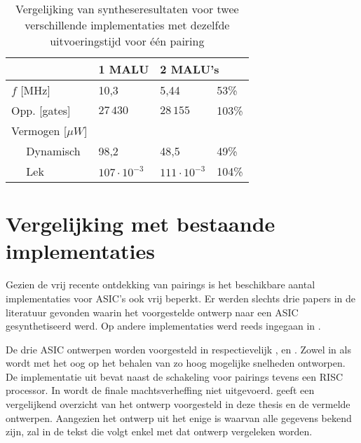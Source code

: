 \begin{table}[h]
	\caption{Vergelijking van syntheseresultaten voor twee verschillende implementaties met dezelfde uitvoeringstijd voor \'e\'en pairing}
	\label{tabel-resultaten-m1-vs-m2}

	\centering
	\begin{tabular}{lll@{$\;\;$}l}
		\toprule
		& 1 MALU	& \multicolumn{2}{l}{2 MALU's}\\
		\midrule
		$f$ [MHz]					& 10,3						& 5,44						& 53\% \\ 
		Opp. [gates]				& $27\,430$					& $28\,155$					& 103\% \\
		Vermogen [$\mu W$]		& 								& 								& \\
		$\quad$ Dynamisch			& 98,2						& 48,5						& 49\% \\
		$\quad$ Lek					& $107 \cdot 10^{-3}$	& $111 \cdot 10^{-3}$	& 104\% \\
		\bottomrule	
	\end{tabular}
\end{table}

\section{Vergelijking met bestaande implementaties}

Gezien de vrij recente ontdekking van pairings is het beschikbare aantal implementaties voor ASIC's ook vrij beperkt. Er werden slechts drie papers in de literatuur gevonden waarin het voorgestelde ontwerp naar een ASIC gesynthetiseerd werd. Op andere implementaties werd reeds ingegaan in .

De drie ASIC ontwerpen worden voorgesteld in respectievelijk \cite{beuchat-asic}, \cite{kammler} en \cite{savas}. Zowel in \cite{beuchat-asic} als \cite{savas} wordt met het oog op het behalen van zo hoog mogelijke snelheden ontworpen. De implementatie uit \cite{kammler} bevat naast de schakeling voor pairings tevens een RISC processor. In \cite{savas} wordt de finale machtsverheffing niet uitgevoerd.  geeft een vergelijkend overzicht van het ontwerp voorgesteld in deze thesis en de vermelde ontwerpen. Aangezien het ontwerp uit \cite{beuchat-asic} het enige is waarvan alle gegevens bekend zijn, zal in de tekst die volgt enkel met dat ontwerp vergeleken worden. 

